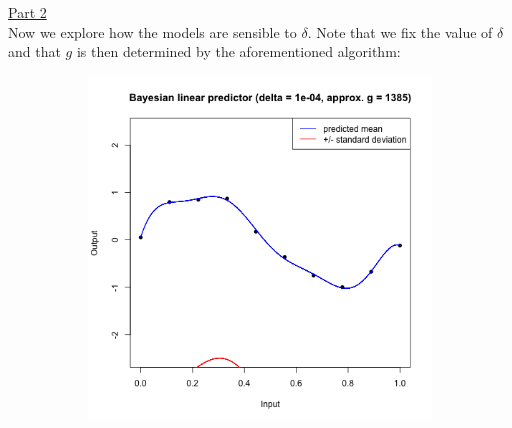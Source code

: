 \documentclass[a4paper, 11pt]{article}
\begin{document}
\newline \underline{Part 2}\\
\newline Now we explore how the models are sensible to $\delta$. Note that we fix the value of $\delta$ and that $g$ is then determined by the aforementioned algorithm:\\
\begin{figure}[H]
\centering
\begin{subfigure}{.5\textwidth}
  \centering
  \includegraphics[width=1\linewidth]{ps3F_plot3_1.png}
\end{subfigure}%
\begin{subfigure}{.5\textwidth}
  \centering

\end{subfigure}
\end{figure}
\end{document}
